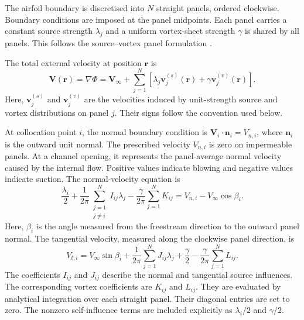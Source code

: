 \documentclass[a4paper,fleqn]{cas-dc}
\begin{document}
The airfoil boundary is discretised into $N$ straight panels, ordered clockwise.
Boundary conditions are imposed at the panel midpoints.
Each panel carries a constant source strength $\lambda_j$ and a uniform vortex-sheet strength $\gamma$ is shared by all panels.
This follows the source--vortex panel formulation \cite{HessSmith1967PotentialFlow,Hess1990PanelMethods}.

The total external velocity at position $\mathbf{r}$ is
\begin{equation}
	\mathbf{V}(\mathbf{r})
	=
	\nabla\Phi
	=
	\mathbf{V}_{\infty}
	+
	\sum_{j=1}^{N}
	\left[
	\lambda_j\mathbf{v}^{(s)}_j(\mathbf{r})
	+
	\gamma\mathbf{v}^{(v)}_j(\mathbf{r})
	\right].
	\label{eq:total_external_velocity}
\end{equation}
Here, $\mathbf{v}^{(s)}_j$ and $\mathbf{v}^{(v)}_j$ are the velocities induced by unit-strength source
and vortex distributions on panel $j$.
Their signs follow the convention used below.

At collocation point $i$, the normal boundary condition is $\mathbf{V}_i\cdot\mathbf{n}_i=V_{n,i}$, where $\mathbf{n}_i$ is the outward unit normal.
The prescribed velocity $V_{n,i}$ is zero on impermeable panels. 
At a channel opening, it represents the panel-average normal velocity caused by the internal flow.
Positive values indicate blowing and negative values indicate suction.
The normal-velocity equation is
\begin{equation}
	\frac{\lambda_i}{2}
	+\frac{1}{2\pi}
	\sum_{\substack{j=1\\j\ne i}}^{N}
	I_{ij}\lambda_j
	-\frac{\gamma}{2\pi}
	\sum_{j=1}^{N}K_{ij}
	=
	V_{n,i}-V_{\infty}\cos\beta_i.
	\label{eq:normal_panel_equation}
\end{equation}
Here, $\beta_i$ is the angle measured from the freestream direction to the outward panel normal.
The tangential velocity, measured along the clockwise panel direction, is
\begin{equation}
	V_{t,i}
	=
	V_{\infty}\sin\beta_i
	+\frac{1}{2\pi}
	\sum_{j=1}^{N}J_{ij}\lambda_j
	+\frac{\gamma}{2}
	-\frac{\gamma}{2\pi}
	\sum_{j=1}^{N}L_{ij}.
	\label{eq:tangential_panel_velocity}
\end{equation}
The coefficients $I_{ij}$ and $J_{ij}$ describe the normal and tangential source influences.
The corresponding vortex coefficients are $K_{ij}$ and $L_{ij}$.
They are evaluated by analytical integration over each straight panel.
Their diagonal entries are set to zero.
The nonzero self-influence terms are included explicitly as $\lambda_i/2$ and $\gamma/2$.
\end{document}
